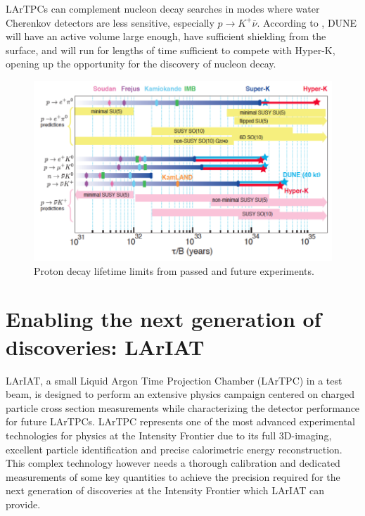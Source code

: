 LArTPCs can complement nucleon decay searches in modes where water Cherenkov detectors are less sensitive, especially $p\rightarrow K^+\bar{\nu}$. According to \cite{Acciarri:Dune}, DUNE will have an active volume large enough, have sufficient shielding from the surface, and will run for lengths of time sufficient to compete with Hyper-K, opening up the opportunity for the discovery of nucleon decay. 

\begin{figure}[hbpt]
\centering
\includegraphics[width=6.5in]{Chapter-2/Images/PDKExperimentalLImit.png}
\caption{Proton decay lifetime limits from passed and future experiments.}
\label{fig:PDKExperimentalLImit}
\end{figure}

\section{Enabling the next generation of discoveries: LArIAT}
LArIAT, a small Liquid Argon Time Projection Chamber (LArTPC) in a test beam,  is designed to perform an extensive physics campaign centered on charged particle cross section measurements while characterizing the detector performance for future LArTPCs. LArTPC represents one of the most advanced experimental technologies for physics at the Intensity Frontier due to its full 3D-imaging, excellent particle identification and precise calorimetric energy reconstruction. This complex technology however needs a thorough calibration and dedicated measurements of some key quantities to achieve the precision required for the next generation of discoveries at the Intensity Frontier which LArIAT can provide. 

